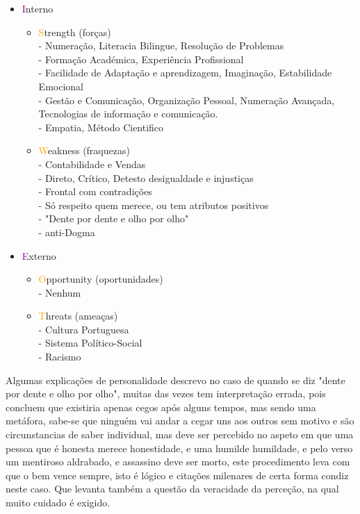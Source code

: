 \begin{itemize}
	\setlength\itemsep{-0.85em}
	\item \textcolor{purple}{I}nterno
	\begin{itemize}
		\setlength\itemsep{-0.3em}
		\item \textcolor{orange}{S}trength (forças) \\
		- Numeração, Literacia Bilingue, Resolução de Problemas \\
		- Formação Académica, Experiência Profissional \\
		- Facilidade de Adaptação e aprendizagem, Imaginação, Estabilidade Emocional \\
		- Gestão e Comunicação, Organização Pessoal, Numeração Avançada, Tecnologias de informação e comunicação. \\
		- Empatia, Método Cientifico
		\item \textcolor{orange}{W}eakness (fraquezas) \\
		- Contabilidade e Vendas \\
		- Direto, Crítico, Detesto desigualdade e injustiças \\
		- Frontal com contradições \\
		- Só respeito quem merece, ou tem atributos positivos \\
		- "Dente por dente e olho por olho" \\
		- anti-Dogma
	\end{itemize}
	\item \textcolor{purple}{E}xterno
	\begin{itemize}
		\setlength\itemsep{-0.3em}
		\item \textcolor{orange}{O}pportunity (oportunidades) \\
		- Nenhum
		\item \textcolor{orange}{T}hreats (ameaças) \\
		- Cultura Portuguesa \\
		- Sistema Político-Social \\
		- Racismo
	\end{itemize}
\end{itemize}
Algumas explicações de personalidade descrevo no caso de quando se diz "dente por dente e olho por olho", muitas das vezes tem interpretação errada, pois concluem que existiria apenas cegos após alguns tempos, mas sendo uma metáfora, sabe-se que ninguém vai andar a cegar uns aos outros sem motivo e são circunstancias de saber individual, mas deve ser percebido no aspeto em que uma pessoa que é honesta merece honestidade, e uma humilde humildade, e pelo verso um mentiroso aldrabado, e assassino deve ser morto, este procedimento leva com que o bem vence sempre, isto é lógico e citações milenares de certa forma condiz neste caso. Que levanta também a questão da veracidade da perceção, na qual muito cuidado é exigido. \\
